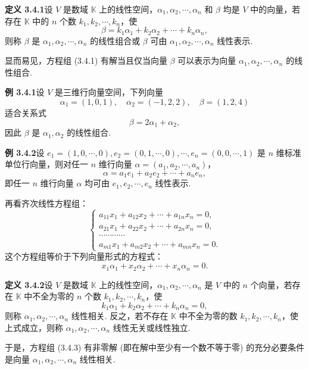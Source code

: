 \documentclass[UTF8, 12pt, fontset=fandol, oneside]{ctexart}
\begin{document}
\noindent\textbf{定义 3.4.1}\quad 设 $V$ 是数域 $\mathbb{K}$ 上的线性空间，$\alpha_1,\alpha_2,\cdots,\alpha_n$ 和 $\beta$ 均是 $V$ 中的向量，若存在 $\mathbb{K}$ 中的 $n$ 个数 $k_1,k_2,\cdots,k_n$，使
\[
\beta=k_1\alpha_1+k_2\alpha_2+\cdots+k_n\alpha_n,
\]
则称 $\beta$ 是 $\alpha_1,\alpha_2,\cdots,\alpha_n$ 的线性组合或 $\beta$ 可由 $\alpha_1,\alpha_2,\cdots,\alpha_n$ 线性表示.

显而易见，方程组 (3.4.1) 有解当且仅当向量 $\beta$ 可以表示为向量 $\alpha_1,\alpha_2,\cdots,\alpha_n$ 的线性组合.

\noindent\textbf{例 3.4.1}\quad 设 $V$ 是三维行向量空间，下列向量
\[
\alpha_1=(1,0,1),\quad \alpha_2=(-1,2,2),\quad \beta=(1,2,4)
\]
适合关系式
\[
\beta=2\alpha_1+\alpha_2,
\]
因此 $\beta$ 是 $\alpha_1,\alpha_2$ 的线性组合.

\noindent\textbf{例 3.4.2}\quad 设 $e_1=(1,0,\cdots,0),e_2=(0,1,\cdots,0),\cdots,e_n=(0,0,\cdots,1)$ 是 $n$ 维标准单位行向量，则对任一 $n$ 维行向量 $\alpha=(a_1,a_2,\cdots,a_n)$，
\[
\alpha=a_1e_1+a_2e_2+\cdots+a_ne_n,
\]
即任一 $n$ 维行向量 $\alpha$ 均可由 $e_1,e_2,\cdots,e_n$ 线性表示.

再看齐次线性方程组：
\begin{equation}
\left\{
\begin{array}{l}
a_{11}x_1+a_{12}x_2+\cdots+a_{1n}x_n=0,\\
a_{21}x_1+a_{22}x_2+\cdots+a_{2n}x_n=0,\\
\cdots\cdots\cdots\cdots\\
a_{m1}x_1+a_{m2}x_2+\cdots+a_{mn}x_n=0.
\end{array}
\right.
\tag{3.4.3}
\end{equation}
这个方程组等价于下列向量形式的方程式：
\begin{equation}
x_1\alpha_1+x_2\alpha_2+\cdots+x_n\alpha_n=0.
\tag{3.4.4}
\end{equation}

\noindent\textbf{定义 3.4.2}\quad 设 $V$ 是数域 $\mathbb{K}$ 上的线性空间，$\alpha_1,\alpha_2,\cdots,\alpha_n$ 是 $V$ 中的 $n$ 个向量，若存在 $\mathbb{K}$ 中不全为零的 $n$ 个数 $k_1,k_2,\cdots,k_n$，使
\[
k_1\alpha_1+k_2\alpha_2+\cdots+k_n\alpha_n=0,
\]
则称 $\alpha_1,\alpha_2,\cdots,\alpha_n$ 线性相关. 反之，若不存在 $\mathbb{K}$ 中不全为零的数 $k_1,k_2,\cdots,k_n$，使上式成立，则称 $\alpha_1,\alpha_2,\cdots,\alpha_n$ 线性无关或线性独立.

于是，方程组 (3.4.3) 有非零解 (即在解中至少有一个数不等于零) 的充分必要条件是向量 $\alpha_1,\alpha_2,\cdots,\alpha_n$ 线性相关.
\end{document}
